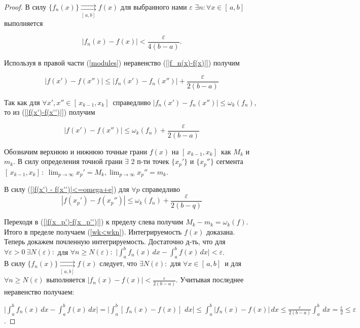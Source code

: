 \begin{proof}
В силу  $\{f_n(x)\} \underset{[\,a,b]\, }{\rightrightarrows}f(x)$ для выбранного нами $\varepsilon$ $\exists n: \forall x \in [\,a,b]\,$ выполняется

\begin{equation}\label{|f_n(x)-f(x)|}
    |f_n(x) - f(x)| < \frac{\varepsilon}{4(b-a)}.
\end{equation}

Используя в правой части (\ref{modules}) неравенство (\ref{|f_n(x)-f(x)|}) получим

\begin{equation}\label{|f(x')-f(x'')|}
    |f(x') - f(x'')| \le |f_n(x') - f_n(x'')| + \frac{\varepsilon}{2(b-a)}
\end{equation}

Так как для $\forall x',x'' \in [\,x_{k-1}, x_k]\,$ справедливо $|f_n(x')-f_n(x'')| \le \omega_k(f_n)$, то из (\ref{|f(x')-f(x'')|}) получим

\begin{equation}\label{|f(x') - f(x'')|<=omega+e}
    |f(x') - f(x'')| \le \omega_k(f_n) + \frac{\varepsilon}{2(b-a)}
\end{equation}

Обозначим верхнюю и нижнюю точные грани $f(x)$ на $[\,x_{k-1}, x_k]\,$ как $M_k$ и $m_k$. В силу определения точной грани $\exists$ 2 п-ти точек $\{x_p'\}$ и $\{x_p''\}$ сегмента $[\,x_{k-1}, x_k]\,: \ \lim_{p \rightarrow \infty}{x_p'} = M_k, \lim_{p \rightarrow \infty}{x_p''} = m_k$.

В силу (\ref{|f(x') - f(x'')|<=omega+e}) для $\forall p$ справедливо
\begin{equation}\label{|f(x_p')-f(x_p'')|}
    |f(x_p')-f(x_p'')| \le \omega_k(f_n) + \frac{\varepsilon}{2(b-q)}
\end{equation}

Переходя в (\ref{|f(x_p')-f(x_p'')|}) к пределу слева получим $M_k - m_k = \omega_k(f)$. Итого в пределе получаем (\ref{wk<wkn}). Интегрируемость $f(x)$ доказана. \\

Теперь докажем почленную интегрируемость. Достаточно д-ть, что для $\forall \varepsilon > 0 \ \exists N(\varepsilon):$ для $\forall n \ge N(\varepsilon):$ $\bigg|\int_{a}^{b} f_n(x) \,dx - \int_{a}^{b} f(x) \,dx\bigg| < \varepsilon$. \\

В силу $\{f_n(x)\} \underset{[\,a,b]\, }{\rightrightarrows}f(x)$ следует, что $\exists N(\varepsilon):$ для $\forall x \in [\,a,b]\,$ и для $\forall n \ge N(\varepsilon)$ выполняется $|f_n(x)-f(x)| < \frac{\varepsilon}{2(b-a)}$. Учитывая последнее неравенство получаем:

$\bigg|\int_{a}^{b} f_n(x) \,dx - \int_{a}^{b} f(x) \,dx\bigg| = \bigg|\int_{a}^{b} [\, f_n(x) - f(x)]\,\,dx\bigg| \le \int_{a}^{b} |f_n(x) - f(x)|\,dx \le \frac{\varepsilon}{2(b-a)}\int_{a}^{b}\,dx = \frac{\varepsilon}{2} \le \varepsilon$.
\end{proof}

